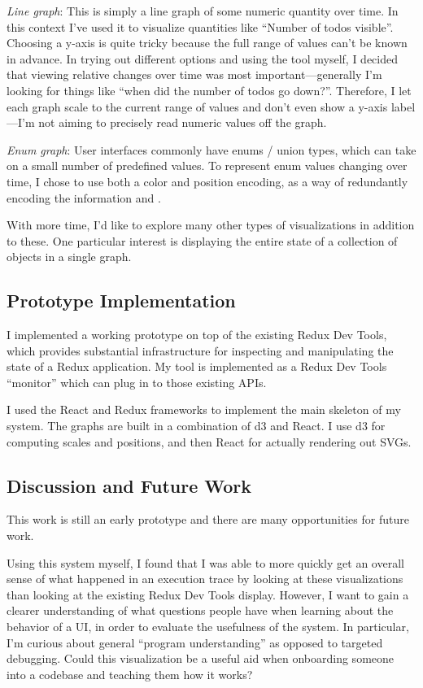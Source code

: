 \documentclass{sigchi}
\begin{document}
\emph{Line graph}: This is simply a line graph of some numeric quantity
over time. In this context I've used it to visualize quantities like
``Number of todos visible''. Choosing a y-axis is quite tricky because
the full range of values can't be known in advance. In trying out
different options and using the tool myself, I decided that viewing
relative changes over time was most important---generally I'm looking
for things like ``when did the number of todos go down?''. Therefore, I
let each graph scale to the current range of values and don't even show
a y-axis label---I'm not aiming to precisely read numeric values off the
graph.

\emph{Enum graph}: User interfaces commonly have enums / union types,
which can take on a small number of predefined values. To represent enum
values changing over time, I chose to use both a color and position
encoding, as a way of redundantly encoding the information and .

With more time, I'd like to explore many other types of visualizations
in addition to these. One particular interest is displaying the entire
state of a collection of objects in a single graph.

\hypertarget{prototype-implementation}{%
\subsection{Prototype Implementation}\label{prototype-implementation}}

I implemented a working prototype on top of the existing Redux Dev
Tools, which provides substantial infrastructure for inspecting and
manipulating the state of a Redux application. My tool is implemented as
a Redux Dev Tools ``monitor'' which can plug in to those existing APIs.

I used the React and Redux frameworks to implement the main skeleton of
my system. The graphs are built in a combination of d3 and React. I use
d3 for computing scales and positions, and then React for actually
rendering out SVGs.

\hypertarget{sec:discussion}{%
\subsection{Discussion and Future Work}\label{sec:discussion}}

This work is still an early prototype and there are many opportunities
for future work.

Using this system myself, I found that I was able to more quickly get an
overall sense of what happened in an execution trace by looking at these
visualizations than looking at the existing Redux Dev Tools display.
However, I want to gain a clearer understanding of what questions people
have when learning about the behavior of a UI, in order to evaluate the
usefulness of the system. In particular, I'm curious about general
``program understanding'' as opposed to targeted debugging. Could this
visualization be a useful aid when onboarding someone into a codebase
and teaching them how it works?
\end{document}
